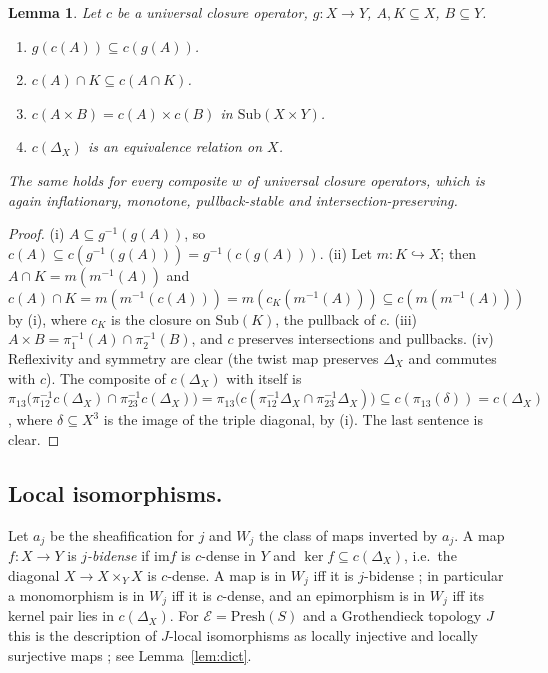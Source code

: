 \documentclass[11pt]{amsart}
\newtheorem{lem}[thm]{Lemma}
\theoremstyle{definition}
\newcommand{\Presh}{\mathrm{Presh}}
\newcommand{\im}{\mathrm{im}}
\newcommand{\Sub}{\mathrm{Sub}}
\newcommand{\cE}{\mathcal E}
\begin{document}
\begin{lem}\label{lem:calc}
Let $c$ be a universal closure operator, $g\colon X\to Y$, $A,K\subseteq X$,
$B\subseteq Y$.
\begin{enumerate}
\item[(i)] $g(c(A))\subseteq c(g(A))$.
\item[(ii)] $c(A)\cap K\subseteq c(A\cap K)$.
\item[(iii)] $c(A\times B)=c(A)\times c(B)$ in $\Sub(X\times Y)$.
\item[(iv)] $c(\Delta_X)$ is an equivalence relation on $X$.
\end{enumerate}
The same holds for every composite $w$ of universal closure operators,
which is again inflationary, monotone, pullback-stable and
intersection-preserving.
\end{lem}
\begin{proof}
(i) $A\subseteq g^{-1}(g(A))$, so $c(A)\subseteq c(g^{-1}(g(A)))=
g^{-1}(c(g(A)))$. (ii) Let $m\colon K\hookrightarrow X$; then $A\cap K=
m(m^{-1}(A))$ and $c(A)\cap K=m(m^{-1}(c(A)))=m(c_K(m^{-1}(A)))\subseteq
c(m(m^{-1}(A)))$ by (i), where $c_K$ is the closure on $\Sub(K)$, the
pullback of $c$. (iii) $A\times B=\pi_1^{-1}(A)\cap\pi_2^{-1}(B)$, and $c$
preserves intersections and pullbacks. (iv) Reflexivity and symmetry are
clear (the twist map preserves $\Delta_X$ and commutes with $c$). The
composite of $c(\Delta_X)$ with itself is $\pi_{13}\bigl(\pi_{12}^{-1}c(\Delta_X)
\cap\pi_{23}^{-1}c(\Delta_X)\bigr)=\pi_{13}\bigl(c(\pi_{12}^{-1}\Delta_X\cap
\pi_{23}^{-1}\Delta_X)\bigr)\subseteq c(\pi_{13}(\delta))=c(\Delta_X)$, where
$\delta\subseteq X^3$ is the image of the triple diagonal, by (i).
The last sentence is clear.
\end{proof}

\subsection*{Local isomorphisms.}
Let $a_j$ be the sheafification for $j$ and $W_j$ the class of maps inverted
by $a_j$. A map $f\colon X\to Y$ is \emph{$j$-bidense} if $\im f$ is
$c$-dense in $Y$ and $\ker f\subseteq c(\Delta_X)$, i.e.\ the diagonal
$X\to X\times_YX$ is $c$-dense. A map is in $W_j$ iff it is $j$-bidense
\cite[A4.3]{Elephant}; in particular a monomorphism is in $W_j$ iff it is
$c$-dense, and an epimorphism is in $W_j$ iff its kernel pair lies in
$c(\Delta_X)$. For $\cE=\Presh(S)$ and a Grothendieck topology $J$ this is
the description of $J$-local isomorphisms as locally injective and locally
surjective maps \cite[III.7, Cor.~6]{MLM}; see Lemma~\ref{lem:dict}.
\end{document}

